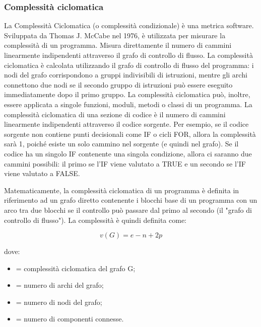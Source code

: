 \subsubsection{Complessità ciclomatica}
La Complessità Ciclomatica (o complessità condizionale) è una metrica software. Sviluppata da Thomas J. McCabe nel 1976, è utilizzata per misurare la complessità di un programma. Misura direttamente il numero di cammini linearmente indipendenti attraverso il grafo di controllo di flusso.
La complessità ciclomatica è calcolata utilizzando il grafo di controllo di flusso del programma: i nodi del grafo corrispondono a gruppi indivisibili di istruzioni, mentre gli archi connettono due nodi se il secondo gruppo di istruzioni può essere eseguito immediatamente dopo il primo gruppo. La complessità ciclomatica può, inoltre, essere applicata a singole funzioni, moduli, metodi o classi di un programma.
La complessità ciclomatica di una sezione di codice è il numero di cammini linearmente indipendenti attraverso il codice sorgente. Per esempio, se il codice sorgente non contiene punti decisionali come IF o cicli FOR, allora la complessità sarà 1, poiché esiste un solo cammino nel sorgente (e quindi nel grafo). Se il codice ha un singolo IF contenente una singola condizione, allora ci saranno due cammini possibili: il primo se l'IF viene valutato a TRUE e un secondo se l'IF viene valutato a FALSE.


Matematicamente, la complessità ciclomatica di un programma è definita in riferimento ad un grafo diretto contenente i blocchi base di un programma con un arco tra due blocchi se il controllo può passare dal primo al secondo (il "grafo di controllo di flusso"). La complessità è quindi definita come:

$$v(G) = e - n + 2p$$

dove:
\begin{itemize}
\item {} = complessità ciclomatica del grafo G;
\item {} = numero di archi del grafo;
\item {} = numero di nodi del grafo;
\item {} = numero di componenti connesse.
\end{itemize}
